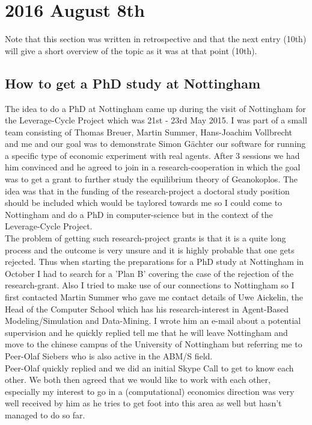 \section*{2016 August 8th}
Note that this section was written in retrospective and that the next entry (10th) will give a short overview of the topic as it was at that point (10th).

\subsection*{How to get a PhD study at Nottingham}
The idea to do a PhD at Nottingham came up during the visit of Nottingham for the Leverage-Cycle Project which was 21st - 23rd May 2015. I was part of a small team consisting of Thomas Breuer, Martin Summer, Hans-Joachim Vollbrecht and me and our goal was to demonstrate Simon Gächter our software for running a specific type of economic experiment with real agents. After 3 sessions we had him convinced and he agreed to join in a research-cooperation in which the goal was to get a grant to further study the equilibrium theory of Geanokoplos. The idea was that in the funding of the research-project a doctoral study position should be included which would be taylored towards me so I could come to Nottingham and do a PhD in computer-science but in the context of the Leverage-Cycle Project. \\
The problem of getting such research-project grants is that it is a quite long process and the outcome is very unsure and it is highly probable that one gets rejected. Thus when starting the preparations for a PhD study at Nottingham in October I had to search for a 'Plan B' covering the case of the rejection of the research-grant. Also I tried to make use of our connections to Nottingham so I first contacted Martin Summer who gave me contact details of Uwe Aickelin, the Head of the Computer School which has his research-interest in Agent-Based Modeling/Simulation and Data-Mining. I wrote him an e-mail about a potential supervision and he quickly replied tell me that he will leave Nottingham and move to the chinese campus of the University of Nottingham but referring me to Peer-Olaf Siebers who is also active in the ABM/S field. \\
Peer-Olaf quickly replied and we did an initial Skype Call to get to know each other. We both then agreed that we would like to work with each other, especially my interest to go in a (computational) economics direction was very well received by him as he tries to get foot into this area as well but hasn't managed to do so far. \\

